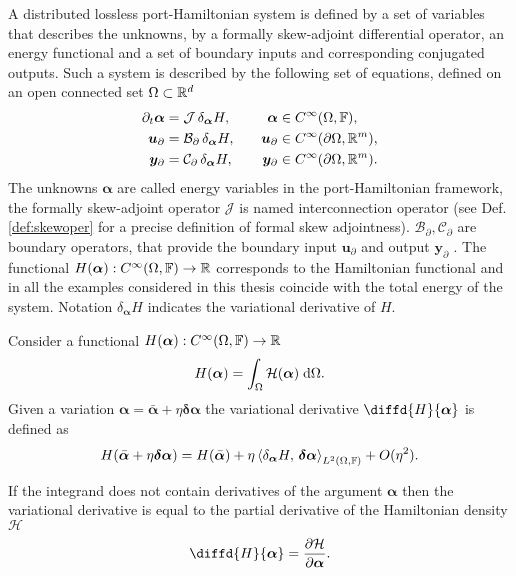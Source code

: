 A distributed lossless port-Hamiltonian system is defined by a set of variables that describes the unknowns, by a formally skew-adjoint differential operator, an energy functional and a set of boundary inputs and corresponding conjugated outputs. Such a system is described by the following set of equations, defined on an open connected set $\Omega \subset \bbR^d$
\begin{equation}\label{eq:phsys}
\begin{aligned}
\partial_t {\bm{\alpha}} &= \mathcal{J} \, \delta_{\bm{\alpha}}{H}, \\
\bm{u}_\partial &= \mathcal{B}_\partial  \, \delta_{\bm{\alpha}}{H}, \\
\bm{y}_\partial &= \mathcal{C}_\partial \, \delta_{\bm{\alpha}}{H}, 
\end{aligned} \qquad
\begin{aligned}
{\bm{\alpha}} &\in C^\infty(\Omega, \bbF),\\
\bm{u}_\partial &\in C^\infty(\partial\Omega,\bbR^m), \\
\bm{y}_\partial &\in C^\infty(\partial\Omega,\bbR^m). 
\end{aligned}
\end{equation}
The unknowns $\bm{\alpha}$ are called energy variables in the port-Hamiltonian framework, the formally skew-adjoint operator $\mathcal{J}$ is named interconnection operator (see Def. \ref{def:skewoper} for a precise definition of formal skew adjointness). $\mathcal{B}_\partial, \mathcal{C}_\partial$ are boundary operators, that provide the boundary input $\bm{u}_\partial$ and output $\bm{y}_\partial$ \cite[Chapter 4]{tucsnak2009observation}. The functional $H(\bm{\alpha}): C^\infty(\Omega, \bbF) \rightarrow \bbR$ corresponds to the Hamiltonian functional and in all the examples considered in this thesis coincide with the total energy of the system. Notation $\delta_{\bm{\alpha}}{H}$ indicates the variational derivative of $H$.

\begin{definition}
Consider a functional $H(\bm{\alpha}): C^\infty(\Omega, \bbF) \rightarrow \bbR$
\begin{equation*} 
H(\bm{\alpha}) = \int_{\Omega} \mathcal{H}(\bm{\alpha}) \d{\Omega}.
\end{equation*}
Given a variation $\bm{\alpha} = \bar{\bm{\alpha}} + \eta \bm{\delta\alpha}$ the variational derivative $\diffd{H}{\bm{\alpha}}$ is defined as
\begin{equation*}
H(\bar{\bm{\alpha}} + \eta \bm{\delta\alpha}) = H(\bar{\bm{\alpha}}) + \eta \inner[L^2(\Omega, \bbF)]{\delta_{\bm{\alpha}}{H}}{\bm{\delta\alpha}} + O(\eta^2).
\end{equation*}
\end{definition}
\begin{remark}
If the integrand does not contain derivatives of the argument $\bm{\alpha}$ then the variational derivative is equal to the partial derivative of the Hamiltonian density $\mathcal{H}$
\begin{equation*}
\diffd{H}{\bm{\alpha}} = \diffp{\mathcal{H}}{\bm{\alpha}}.
\end{equation*}
\end{remark}

